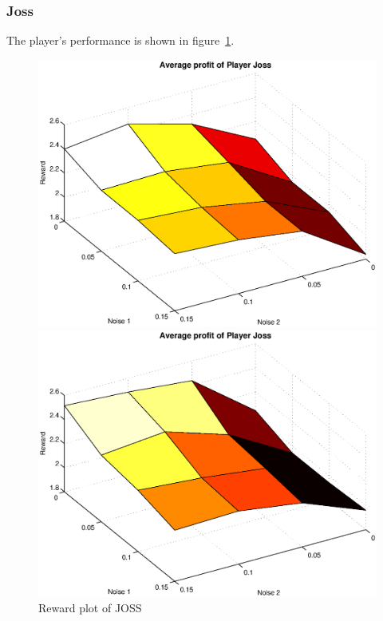 \subsubsection{Joss}
The player's performance is shown in figure~\ref{pic player joss}.\\
\begin{figure}[h]
	\caption{Reward plot of JOSS}
	\label{pic player joss}
\begin{minipage}[hbt]{0.65\textwidth}
	\centering
	\includegraphics[width=\textwidth]{pics/simulation1/Reward_vs_Noise_of_Player_Joss}
\end{minipage}
\hfill
\begin{minipage}[hbt]{0.3\textwidth}
	\centering
	\includegraphics[width=\textwidth]{pics/simulation2/Reward_vs_Noise_of_Player_Joss}
\end{minipage}

\end{figure}

